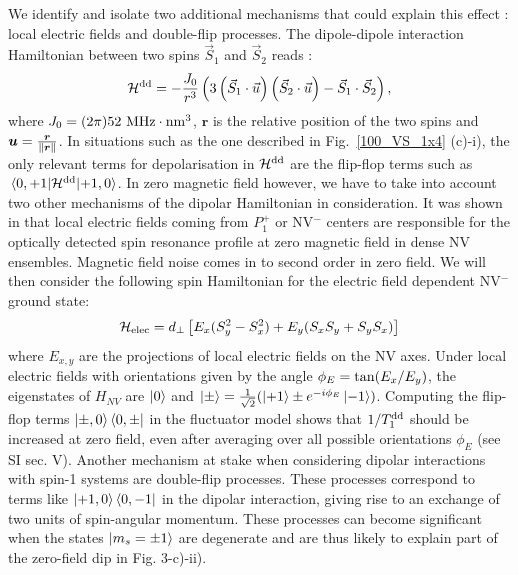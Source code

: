 \documentclass[preprintnumbers,amsmath,amssymb,superscriptaddress,twocolumn,showpacs]{revtex4-2}
\begin{document}
We identify and isolate two additional mechanisms that could explain this effect : local electric fields and double-flip processes. 
The dipole-dipole interaction Hamiltonian between two spins ${\vec S}_1$ and ${\vec S}_2$ reads :
\begin{equation}
\mathcal{H}^{\rm dd}= -\frac{J_0}{r^3}\left(3\left({\vec S}_1 \cdot \vec u \right)\left({\vec S}_2 \cdot \vec u \right) - {\vec S}_1 \cdot {\vec S}_2  \right),
\end{equation}
where $J_0= (2 \pi) 52\ \rm MHz \cdot \rm{nm}^3$, $\bm r$ is the relative position of the two spins and $\bm  u = \frac{\bm  r}{\norm{\bm  r}}$. In situations such as the one described in Fig.~\ref{100_VS_1x4} (c)-i), the only relevant terms for depolarisation in $\mathcal{H}^{\rm dd}$ are the flip-flop terms such as $\mel{0,+1}{\mathcal{H}^{\rm dd}}{+1,0}$. In zero magnetic field however, we have to take into account two other mechanisms of the dipolar Hamiltonian in consideration.
It was shown in  \cite{mittiga2018imaging} that local electric fields coming from $P_1^+$ or NV$^-$ centers are responsible for the optically detected spin resonance profile at zero magnetic field in dense NV ensembles. Magnetic field noise comes in to second order in zero field. %
We will then consider the following spin Hamiltonian for the electric field dependent NV$^-$ ground state: 
\begin{equation}
\label{NV Hamiltonian}
\mathcal{H}_{\rm elec}= d_\perp \left[ E_x(S_y^2-S_x^2) + E_y(S_xS_y+S_yS_x) \right]
\end{equation}
where $E_{x,y}$ are the projections of local electric fields on the NV axes. 
Under local electric fields with orientations given by the angle $\phi_E={\rm tan}(E_x/E_y)$, the eigenstates of $H_{NV}$ are $\ket{0}$ and $\ket{\pm}=\frac{1}{\sqrt{2}}(\ket{+1}\pm e^{-i\phi_E}\ket{-1})$.
Computing the flip-flop terms $\ket{\pm,0} \bra{0,\pm} $ in the fluctuator model shows that $1/T_1^{\rm dd}$ should be increased at zero field, even after averaging over all possible orientations $\phi_E$ (see SI sec. V).  Another mechanism at stake when considering dipolar interactions with spin-1 systems are double-flip processes. 
These processes correspond to terms like $\ket{+1,0} \bra{0,-1}$ in the dipolar interaction, giving rise to an exchange of two units of spin-angular momentum. These processes can become significant when the states $\ket{m_s=\pm 1}$ are degenerate and are thus likely to explain part of the zero-field dip in Fig. 3-c)-ii). 
\end{document}
